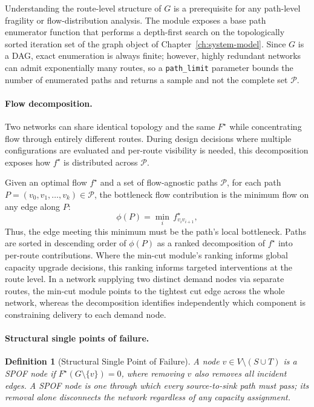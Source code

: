 \documentclass[12pt]{report}
\newtheorem{definition}{Definition}
\begin{document}
Understanding the route-level structure of $G$ is a prerequisite for any path-level fragility or flow-distribution analysis. The module exposes a base path enumerator function that performs a depth-first search on the topologically sorted iteration set of the graph object of Chapter~\ref{ch:system-model}. Since $G$ is a DAG, exact enumeration is always finite; however, highly redundant networks can admit exponentially many routes, so a \texttt{path\_limit} parameter bounds the number of enumerated paths and returns a sample and not the complete set $\mathcal{P}$.


\paragraph{Flow decomposition.}
Two networks can share identical topology and the same $F^\star$ while concentrating flow through entirely different routes. During design decisions where multiple configurations are evaluated and per-route visibility is needed, this decomposition exposes how $f^\star$ is distributed across $\mathcal{P}$.

Given an optimal flow $f^\star$ and a set of flow-agnostic paths $\mathcal{P}$, for each path $P = (v_0, v_1, \ldots, v_k) \in 
\mathcal{P}$, the bottleneck flow contribution is the minimum flow on any edge along $P$:
\[
\phi(P) = \min_{i}\, f^\star_{v_i v_{i+1}},
\]
 Thus, the edge meeting this minimum must be the path's local bottleneck. Paths are sorted in descending order of $\phi(P)$ as a ranked decomposition of $f^\star$ into per-route contributions. Where the min-cut module's ranking informs global capacity upgrade decisions, this ranking informs targeted interventions at the route level. In a network supplying two distinct demand nodes via separate routes, the min-cut module points to the tightest cut edge across the whole network, whereas the decomposition identifies independently which component is constraining delivery to each demand node.

\paragraph{Structural single points of failure.}

\begin{definition}[Structural Single Point of Failure] 
A node $v \in V \setminus (S \cup T)$ is a SPOF node if $F^\star(G \setminus \{v\}) = 0$, where removing $v$ also removes all incident edges. A SPOF node is one through which every source-to-sink path must pass; its removal alone disconnects the network regardless of any capacity assignment. 
\end{definition} 
\end{document}
